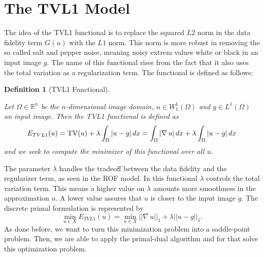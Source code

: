 \documentclass[abstracton]{scrreprt}
\newtheorem{definition}[theorem]{Definition}
\begin{document}


    \section{The TVL1 Model} %
    \label{sec:the_tvl1_model}
        
        The idea of the TVL1 functional is to replace the squared $L2$ norm in the data fidelity term $G(u)$ with the $L1$ norm. This norm is more robust in removing the so called salt and pepper noise, meaning noisy extrem values white or black in an input image $g$. The name of this functional rises from the fact that it also uses the total variation as a regularization term. The functional is defined as follows:
        \begin{definition}[TVL1 Functional] %
        \label{def:tvl1_functional}

            Let $\Omega \in \mathbb{R}^{n}$ be the $n$-dimensional image domain, $u \in W_{1}^{1}(\Omega)$ and $g \in L^{1}(\Omega)$ an input image. Then the TVL1 functional is defined as
                \begin{equation}
                    E_{TVL1}(u) = \textnormal{TV}(u) + \lambda \int_{\Omega} |u - g| \, dx = \int_{\Omega} |\nabla \, u| \, dx + \lambda \int_{\Omega} |u - g| \, dx
                \end{equation}
            and we seek to compute the minimizer of this functional over all $u$.

        \end{definition}
        The parameter $\lambda$ handles the tradeoff between the data fidelity and the regularizer term, as seen in the ROF model. In this functional $\lambda$ controls the total variation term. This means a higher value on $\lambda$ amounts more smoothness in the approximation $u$. A lower value assures that $u$ is closer to the input image $g$. The discrete primal formulation is represented by
            \begin{equation}
                \min_{u \in X} E_{TVL1}(u) = \min_{u \in X} ||\nabla \, u||_{1} + \lambda ||u - g||_{1}.
                \label{eq:primal_formulation_tvl1}
            \end{equation}
        As done before, we want to turn this minimization problem into a saddle-point problem. Then, we are able to apply the primal-dual algorithm and for that solve this optimization problem.
\end{document}
